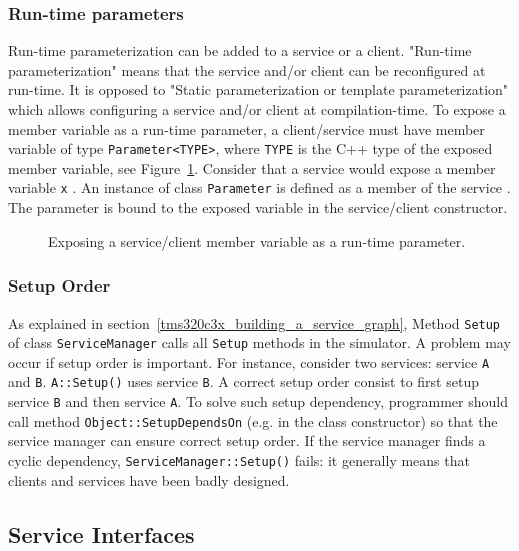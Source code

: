 \subsubsection{Run-time parameters}

Run-time parameterization can be added to a service or a client. "Run-time parameterization" means that the service and/or client can be reconfigured at run-time. It is opposed to "Static parameterization or template parameterization" which allows configuring a service and/or client at compilation-time.
To expose a member variable as a run-time parameter, a client/service must have member variable of type \texttt{Parameter<TYPE>}, where \texttt{TYPE} is the C++ type of the exposed member variable, see Figure~\ref{fig:tms320c3x_run_time_parameter}. Consider that a service would expose a member variable \texttt{x} . An instance of class \texttt{Parameter} is defined as a member of the service . 
The parameter is bound to the exposed variable  in the service/client constructor.

\begin{figure}[h]
  \begin{center}
    
    \caption{\label{fig:tms320c3x_run_time_parameter} Exposing a service/client member variable as a run-time parameter.}
  \end{center}
\end{figure}

\subsubsection{Setup Order}

As explained in section~\ref{tms320c3x_building_a_service_graph}, Method \texttt{Setup} of class \texttt{ServiceManager} calls all \texttt{Setup} methods in the simulator. A problem may occur if setup order is important. For instance, consider two services: service \texttt{A} and \texttt{B}. \texttt{A::Setup()} uses service \texttt{B}. A correct setup order consist to first setup service \texttt{B} and then service \texttt{A}.
To solve such setup dependency, programmer should call method \texttt{Object::SetupDependsOn} (e.g. in the class constructor) so that the service manager can ensure correct setup order.
If the service manager finds a cyclic dependency, \texttt{ServiceManager::Setup()} fails: it generally means that clients and services have been badly designed.

\newpage
\subsection{Service Interfaces}
\label{tms320c3x_interfaces}

